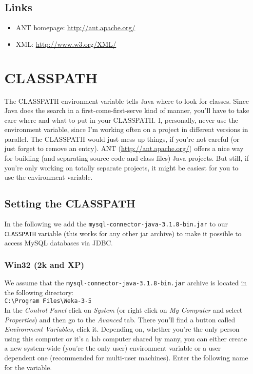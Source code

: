 \subsection{Links}
\begin{itemize}
\item ANT homepage: \url{http://ant.apache.org/}{}
\item XML: \url{http://www.w3.org/XML/}{}
\end{itemize}


\section{CLASSPATH}
\label{CLASSPATH}
The CLASSPATH environment variable tells Java where to look for
classes. Since Java does the search in a first-come-first-serve kind
of manner, you'll have to take care where and what to put in your
CLASSPATH. I, personally, never use the environment variable, since
I'm working often on a project in different versions in parallel. The
CLASSPATH would just mess up things, if you're not careful (or just
forget to remove an entry). ANT (\url{http://ant.apache.org/}{}) offers
a nice way for building (and separating source code and class files)
Java projects. But still, if you're only working on totally separate
projects, it might be easiest for you to use the environment variable.

\subsection{Setting the CLASSPATH} 
In the following we add the \verb=mysql-connector-java-3.1.8-bin.jar=
to our \verb=CLASSPATH= variable (this works for any other jar archive) to make it possible to
access MySQL databases via JDBC.

\subsubsection*{Win32 (2k and XP)}
We assume that the \verb=mysql-connector-java-3.1.8-bin.jar= archive is located in the following directory:\\

\verb=C:\Program Files\Weka-3-5=\\

\noindent In the \emph{Control Panel} click on \emph{System} (or right click on
\emph{My Computer} and select \emph{Properties}) and then go to the
\emph{Avanced} tab. There you'll find a button called \emph{Environment
Variables}, click it. Depending on, whether you're the only person
using this computer or it's a lab computer shared by many, you can
either create a new system-wide (you're the only user) environment
variable or a user dependent one (recommended for multi-user
machines). Enter the following name for the variable.\\

